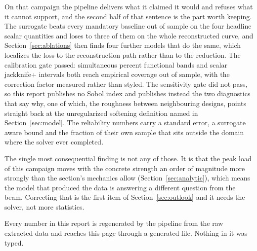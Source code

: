 \documentclass[11pt,a4paper]{article}
\begin{document}
On that campaign the pipeline delivers what it claimed it would and refuses what it cannot
support, and the second half of that sentence is the part worth keeping. The surrogate beats
every mandatory baseline out of sample on the four headline scalar quantities and loses to three
of them on the whole reconstructed curve, and Section~\ref{sec:ablations} then finds four
further models that do the same, which localizes the loss to the reconstruction path rather than
to the reduction. The calibration gate passed: simultaneous \MCBandLevel{} percent functional
bands and scalar jackknife+ intervals both reach \BandForceCoverage{} empirical coverage out of
sample, with the correction factor measured rather than styled. The sensitivity gate did not
pass, so this report publishes no Sobol index and publishes instead the two diagnostics that say
why, one of which, the roughness between neighbouring designs, points straight back at the
unregularized softening definition named in Section~\ref{sec:model}. The reliability numbers
carry a standard error, a surrogate aware bound and the fraction of their own sample that sits
outside the domain where the solver ever completed.

The single most consequential finding is not any of those. It is that the peak load of this
campaign moves with the concrete strength an order of magnitude more strongly than the section's
mechanics allow (Section~\ref{sec:analytic}), which means the model that produced the data is
answering a different question from the beam. Correcting that is the first item of
Section~\ref{sec:outlook} and it needs the solver, not more statistics.

Every number in this report is regenerated by the pipeline from the raw extracted data and reaches this page through a generated file. Nothing in it was typed.



\end{document}
